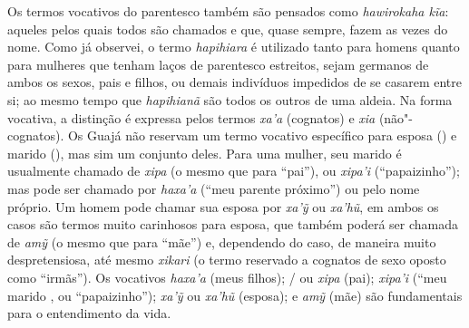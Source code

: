 Os termos vocativos do parentesco também são pensados como
\emph{hawirokaha kĩa}: aqueles pelos quais todos são chamados e que,
quase sempre, fazem as vezes do nome. Como já observei, o termo
\emph{hapihiara} é utilizado tanto para homens quanto para mulheres que
tenham laços de parentesco estreitos, sejam germanos de ambos os sexos,
pais e filhos, ou demais indivíduos impedidos de se casarem entre si; ao
mesmo tempo que \emph{hapihianã} são todos os outros de uma aldeia. Na
forma vocativa, a distinção é expressa pelos termos \emph{xa'a}
(cognatos) e \emph{xia} (não"-cognatos). Os Guajá não reservam um termo
vocativo específico para esposa () e marido (), mas sim um conjunto
deles. Para uma mulher, seu marido é usualmente chamado de \emph{xipa}
(o mesmo que para ``pai''), ou \emph{xipa'i} (``papaizinho''); mas pode
ser chamado por \emph{haxa'a} (``meu parente próximo'') ou pelo nome
próprio. Um homem pode chamar sua esposa por \emph{xa'ỹ} ou
\emph{xa'hũ}, em ambos os casos são termos muito carinhosos para esposa,
que também poderá ser chamada de \emph{amỹ} (o mesmo que para ``mãe'') e,
dependendo do caso, de maneira muito despretensiosa, até mesmo
\emph{xikari} (o termo reservado a cognatos de sexo oposto como
``irmãs''). Os vocativos \emph{haxa'a} (meus filhos); / ou \emph{xipa}
(pai); \emph{xipa'i} (``meu marido , ou ``papaizinho''); \emph{xa'ỹ} ou
\emph{xa'hũ} (esposa); e \emph{amỹ} (mãe) são fundamentais para o
entendimento da vida.

